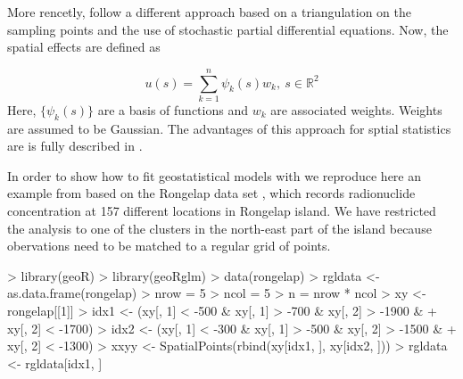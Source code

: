 \documentclass[article]{jss}
\begin{document}
More rencetly, \citet{Lindgren:2011} follow a different approach based on
a triangulation on the sampling points and the use of stochastic partial
differential equations. Now, the spatial effects are defined as

$$
u(s)=\sum_{k=1}^n \psi_k(s)w_k,\ s\in \mathbb{R}^2
$$
\noindent
Here, $\{\psi_k(s)\}$ are a basis of functions and $w_k$ are associated
weights. Weights are assumed to be Gaussian. The advantages of this approach
for sptial statistics are is fully described in \citet{Camelettietal:2013}.


In order to show how to fit geostatistical models with  we
reproduce here an example from \citet{GomezRubioetal:2013} based on the
Rongelap data set \citep{DiggleRibeiro:2007}, which records  radionuclide
concentration at 157 different locations in Rongelap island. We have restricted
the analysis to one of the clusters in the north-east part of the island
because obervations need to be matched to a regular grid of points.

\begin{Schunk}
\begin{Sinput}
> library(geoR)
> library(geoRglm)
> data(rongelap)
> rgldata <- as.data.frame(rongelap)
> nrow = 5
> ncol = 5
> n = nrow * ncol
> xy <- rongelap[[1]]
> idx1 <- (xy[, 1] < -500 & xy[, 1] > -700 & xy[, 2] > -1900 & 
+     xy[, 2] < -1700)
> idx2 <- (xy[, 1] < -300 & xy[, 1] > -500 & xy[, 2] > -1500 & 
+     xy[, 2] < -1300)
> xxyy <- SpatialPoints(rbind(xy[idx1, ], xy[idx2, ]))
> rgldata <- rgldata[idx1, ]
\end{Sinput}
\end{Schunk}

\begin{Schunk}
\end{Schunk}
\end{document}
